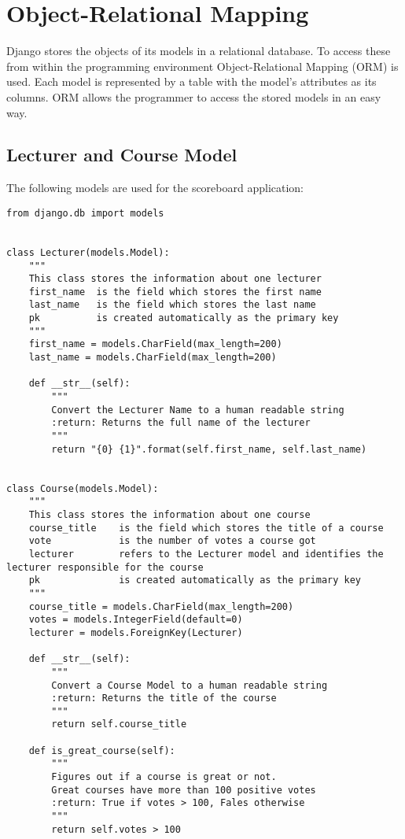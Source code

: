 \section{Object-Relational Mapping}

Django stores the objects of its models in a relational database. To access these from within the programming environment Object-Relational Mapping (ORM) is used. Each model is represented by a table with the model's attributes as its columns. ORM allows the programmer to access the stored models in an easy way.

\subsection{Lecturer and Course Model}
The following models are used for the scoreboard application:

\begin{lstlisting}[style=Python, caption=scorecard/models.py, label=lst:models.py]
from django.db import models


class Lecturer(models.Model):
    """
    This class stores the information about one lecturer
    first_name  is the field which stores the first name
    last_name   is the field which stores the last name
    pk          is created automatically as the primary key
    """
    first_name = models.CharField(max_length=200)
    last_name = models.CharField(max_length=200)

    def __str__(self):
        """
        Convert the Lecturer Name to a human readable string
        :return: Returns the full name of the lecturer
        """
        return "{0} {1}".format(self.first_name, self.last_name)


class Course(models.Model):
    """
    This class stores the information about one course
    course_title    is the field which stores the title of a course
    vote            is the number of votes a course got
    lecturer        refers to the Lecturer model and identifies the lecturer responsible for the course
    pk              is created automatically as the primary key
    """
    course_title = models.CharField(max_length=200)
    votes = models.IntegerField(default=0)
    lecturer = models.ForeignKey(Lecturer)

    def __str__(self):
        """
        Convert a Course Model to a human readable string
        :return: Returns the title of the course
        """
        return self.course_title

    def is_great_course(self):
        """
        Figures out if a course is great or not.
        Great courses have more than 100 positive votes
        :return: True if votes > 100, Fales otherwise
        """
        return self.votes > 100
\end{lstlisting}

